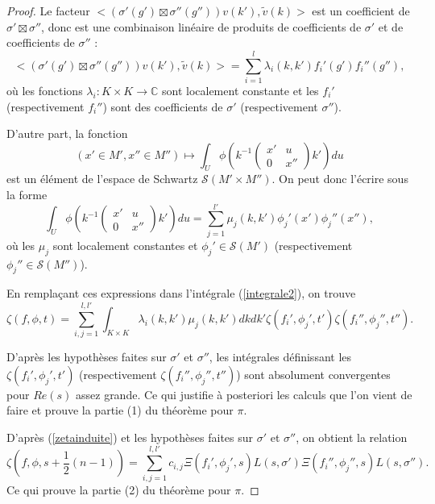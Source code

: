 \begin{proof}
Le facteur $<(\sigma'(g') \boxtimes \sigma''(g''))v(k'), \tilde{v}(k)>$ est un coefficient de $\sigma' \boxtimes \sigma''$, donc est une combinaison linéaire de produits de coefficients de $\sigma'$ et de coefficients de $\sigma''$ :
\begin{equation}
<(\sigma'(g') \boxtimes \sigma''(g''))v(k'), \tilde{v}(k)> = \sum_{i=1}^l \lambda_i(k,k')f_i'(g')f_i''(g''),
\end{equation}
où les fonctions $\lambda_i : K \times K \rightarrow \mathbb{C}$ sont localement constante et les $f_i'$ (respectivement $f_i''$) sont des coefficients de $\sigma'$ (respectivement $\sigma''$).

D'autre part, la fonction
\begin{equation}
(x' \in M', x'' \in M'') \mapsto \int_U \phi(k^{-1}\begin{pmatrix} 
x' & u \\
0 & x'' 
\end{pmatrix} k') du
\end{equation}
est un élément de l'espace de Schwartz $\mathcal{S}(M' \times M'')$. On peut donc l'écrire sous la forme
\begin{equation}
\label{u_integrale}
\int_U \phi(k^{-1}\begin{pmatrix} 
x' & u \\
0 & x'' 
\end{pmatrix} k') du = \sum_{j=1}^{l'} \mu_j(k, k')\phi_j'(x')\phi_j''(x''),
\end{equation}
où les $\mu_j$ sont localement constantes et $\phi_j' \in \mathcal{S}(M')$ (respectivement $\phi_j'' \in \mathcal{S}(M'')$).

En remplaçant ces expressions dans l'intégrale (\ref{integrale2}), on trouve
\begin{equation}
\label{zetainduite}
\zeta(f, \phi, t) = \sum_{i,j=1}^{l,l'} \int_{K \times K} \lambda_i(k,k')\mu_j(k,k') dk dk' \zeta(f_i',\phi_j',t') \zeta(f_i'',\phi_j'',t'').
\end{equation}

D'après les hypothèses faites sur $\sigma'$ et $\sigma''$, les intégrales définissant les $\zeta(f_i',\phi_j',t')$ (respectivement $\zeta(f_i'',\phi_j'',t'')$) sont absolument convergentes pour $Re(s)$ assez grande. Ce qui justifie à posteriori les calculs que l'on vient de faire et prouve la partie (1) du théorème pour $\pi$.

D'après (\ref{zetainduite}) et les hypothèses faites sur $\sigma'$ et $\sigma''$, on obtient la relation
\begin{equation}
\zeta(f,\phi,s+\frac{1}{2}(n-1))=\sum_{i,j=1}^{l,l'}c_{i,j}\Xi(f_i',\phi_j',s)L(s,\sigma')\Xi(f_i'',\phi_j'',s)L(s,\sigma'').
\end{equation}
Ce qui prouve la partie (2) du théorème pour $\pi$.


\end{proof}
